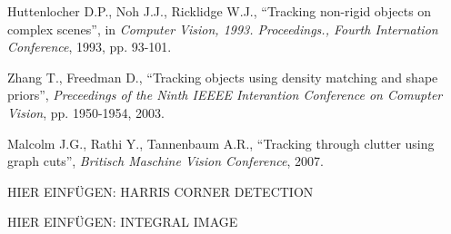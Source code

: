 \begin{thebibliography}{SMAT}
 Huttenlocher D.P., Noh J.J., Ricklidge W.J., ``Tracking non-rigid objects on complex scenes'', in \textit{Computer Vision, 1993. Proceedings., Fourth Internation Conference}, 1993, pp. 93-101.

 Zhang T., Freedman D., ``Tracking objects using density matching and shape priors'', \textit{Preceedings of the Ninth IEEEE Interantion Conference on Comupter Vision}, pp. 1950-1954, 2003.

 Malcolm J.G., Rathi Y., Tannenbaum A.R., ``Tracking through clutter using graph cuts'', \textit{Britisch Maschine Vision Conference}, 2007.

 HIER EINFÜGEN: HARRIS CORNER DETECTION

 HIER EINFÜGEN: INTEGRAL IMAGE

\end{thebibliography}